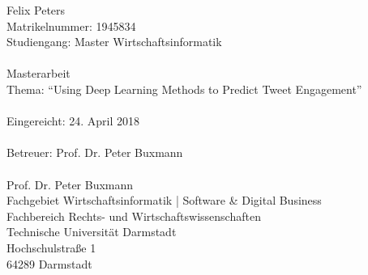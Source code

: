 %
%
%
%
\vspace*{\fill}
\singlespacing 
\noindent Felix Peters \\
Matrikelnummer: 1945834 \\
Studiengang: Master Wirtschaftsinformatik \\\\
Masterarbeit \\
Thema: ``Using Deep Learning Methods to Predict Tweet Engagement'' \\\\
Eingereicht: 24. April 2018 \\\\
Betreuer: Prof. Dr. Peter Buxmann \\\\
Prof. Dr. Peter Buxmann \\
Fachgebiet Wirtschaftsinformatik | Software \& Digital Business \\
Fachbereich Rechts- und Wirtschaftswissenschaften \\
Technische Universität Darmstadt \\
Hochschulstraße 1 \\
64289 Darmstadt \\

\onehalfspacing

\setcounter{page}{2}
